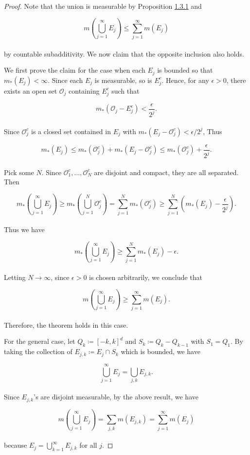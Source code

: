 \documentclass[12pt, a4paper, openany, twoside]{book}
\theoremstyle{definition}
\theoremstyle{remark}
\theoremstyle{plain}
\numberwithin{equation}{section}
\begin{document}
\begin{proof}
    Note that the union is measurable by Proposition \hyperref[Proposition 1.3.1]{1.3.1} and 
    
    \[m\left(\bigcup_{j=1}^{\infty}{E_j}\right)\leq\sum_{j=1}^{\infty}{m(E_j)}\]
    \\
    by countable subadditivity. We now claim that the opposite inclusion also holds.
    
    We first prove the claim for the case when each $E_j$ is bounded so that $m_*(E_j)<\infty$. Since each $E_j$ is measurable, so is $E_j^c$. Hence, for any $\epsilon>0$, there exists an open set $\mathcal{O}_j$ containing $E_j^c$ such that 

    \[m_*(\mathcal{O}_j-E_j^c)<\frac{\epsilon}{2^j}.\]
    \\
    Since $\mathcal{O}_j^c$ is a closed set contained in $E_j$ with $m_*(E_j-\mathcal{O}_j^c)<\epsilon/2^j$, Thus
    
    \[m_*(E_j)\leq m_*(\mathcal{O}_j^c)+m_*(E_j-\mathcal{O}_j^c)\leq m_*(\mathcal{O}_j^c)+\frac{\epsilon}{2^j}.\]
    \\
    Pick some $N$. Since $\mathcal{O}_1^c,\dots,\mathcal{O}_N^c$ are disjoint and compact, they are all separated. Then 

    \[m_*\left(\bigcup_{j=1}^{\infty}{E_j}\right)\geq m_*\left(\bigcup_{j=1}^{N}{\mathcal{O}_j^c}\right)=\sum_{j=1}^{N}{m_*(\mathcal{O}_j^c)}\geq\sum_{j=1}^{N}{\left(m_*(E_j)-\frac{\epsilon}{2^j}\right)}.\]
    \\
    Thus we have 

    \[m_*\left(\bigcup_{j=1}^{\infty}{E_j}\right)\geq \sum_{j=1}^{N}{m_*(E_j)}-\epsilon.\]
    \\
    Letting $N\rightarrow\infty$, since $\epsilon>0$ is chosen arbitrarily, we conclude that 

    \[m\left(\bigcup_{j=1}^{\infty}{E_j}\right)\geq \sum_{j=1}^{\infty}{m(E_j)}.\]
    \\
    Therefore, the theorem holds in this case.

    \indent For the general case, let $Q_k\coloneqq [-k,k]^d$ and $S_k\coloneqq Q_k-Q_{k-1}$ with $S_1=Q_1$. By taking the collection of $E_{j,k}\coloneqq E_j\cap S_k$ which is bounded, we have 

    \[\bigcup_{j=1}^{\infty}{E_j}=\bigcup_{j,k}{E_{j,k}}.\]
    \\
    Since $E_{j,k}$'s are disjoint measurable, by the above result, we have 

    \[m\left(\bigcup_{j=1}^{\infty}{E_j}\right)=\sum_{j,k}{m(E_{j,k})}=\sum_{j=1}^{\infty}{m(E_j)}\]
    \\
    because $E_j=\bigcup_{k=1}^{\infty}{E_{j,k}}$ for all $j$.  
\end{proof}
\vspace{5mm}
\end{document}
